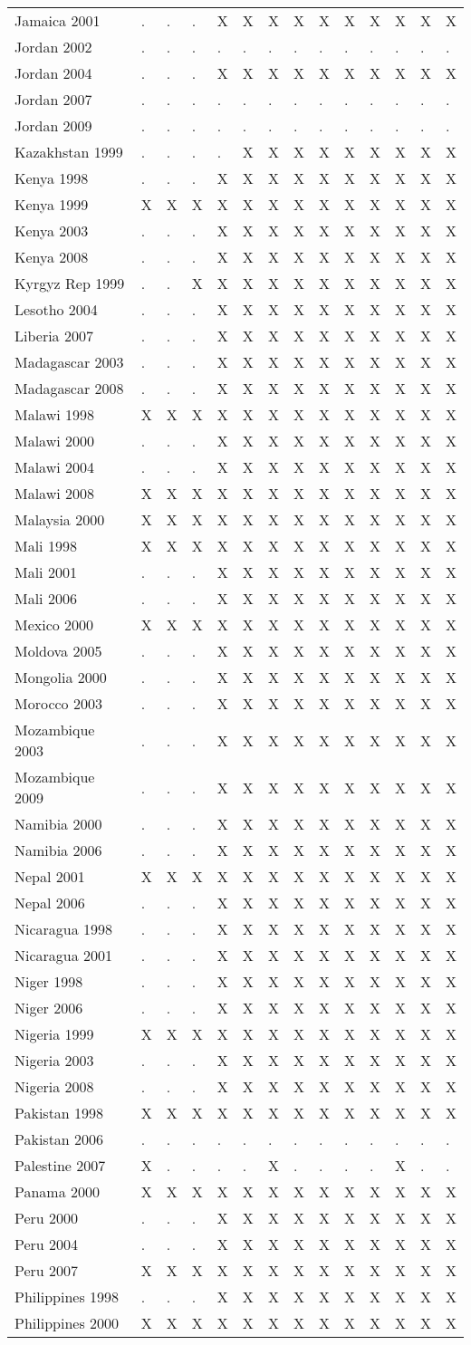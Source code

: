 \documentclass[a4paper]{article}
\begin{document}
\begin{longtable}{llllllllllllll}
Jamaica 2001&.&.&.&X&X&X&X&X&X&X&X&X&X\tabularnewline
Jordan 2002&.&.&.&.&.&.&.&.&.&.&.&.&.\tabularnewline
Jordan 2004&.&.&.&X&X&X&X&X&X&X&X&X&X\tabularnewline
Jordan 2007&.&.&.&.&.&.&.&.&.&.&.&.&.\tabularnewline
Jordan 2009&.&.&.&.&.&.&.&.&.&.&.&.&.\tabularnewline
Kazakhstan 1999&.&.&.&.&X&X&X&X&X&X&X&X&X\tabularnewline
Kenya 1998&.&.&.&X&X&X&X&X&X&X&X&X&X\tabularnewline
Kenya 1999&X&X&X&X&X&X&X&X&X&X&X&X&X\tabularnewline
Kenya 2003&.&.&.&X&X&X&X&X&X&X&X&X&X\tabularnewline
\newpage
Kenya 2008&.&.&.&X&X&X&X&X&X&X&X&X&X\tabularnewline
Kyrgyz Rep 1999&.&.&X&X&X&X&X&X&X&X&X&X&X\tabularnewline
Lesotho 2004&.&.&.&X&X&X&X&X&X&X&X&X&X\tabularnewline
Liberia 2007&.&.&.&X&X&X&X&X&X&X&X&X&X\tabularnewline
Madagascar 2003&.&.&.&X&X&X&X&X&X&X&X&X&X\tabularnewline
Madagascar 2008&.&.&.&X&X&X&X&X&X&X&X&X&X\tabularnewline
Malawi 1998&X&X&X&X&X&X&X&X&X&X&X&X&X\tabularnewline
Malawi 2000&.&.&.&X&X&X&X&X&X&X&X&X&X\tabularnewline
Malawi 2004&.&.&.&X&X&X&X&X&X&X&X&X&X\tabularnewline
Malawi 2008&X&X&X&X&X&X&X&X&X&X&X&X&X\tabularnewline
Malaysia 2000&X&X&X&X&X&X&X&X&X&X&X&X&X\tabularnewline
Mali 1998&X&X&X&X&X&X&X&X&X&X&X&X&X\tabularnewline
Mali 2001&.&.&.&X&X&X&X&X&X&X&X&X&X\tabularnewline
Mali 2006&.&.&.&X&X&X&X&X&X&X&X&X&X\tabularnewline
Mexico 2000&X&X&X&X&X&X&X&X&X&X&X&X&X\tabularnewline
Moldova 2005&.&.&.&X&X&X&X&X&X&X&X&X&X\tabularnewline
Mongolia 2000&.&.&.&X&X&X&X&X&X&X&X&X&X\tabularnewline
Morocco 2003&.&.&.&X&X&X&X&X&X&X&X&X&X\tabularnewline
Mozambique 2003&.&.&.&X&X&X&X&X&X&X&X&X&X\tabularnewline
Mozambique 2009&.&.&.&X&X&X&X&X&X&X&X&X&X\tabularnewline
Namibia 2000&.&.&.&X&X&X&X&X&X&X&X&X&X\tabularnewline
Namibia 2006&.&.&.&X&X&X&X&X&X&X&X&X&X\tabularnewline
Nepal 2001&X&X&X&X&X&X&X&X&X&X&X&X&X\tabularnewline
Nepal 2006&.&.&.&X&X&X&X&X&X&X&X&X&X\tabularnewline
Nicaragua 1998&.&.&.&X&X&X&X&X&X&X&X&X&X\tabularnewline
Nicaragua 2001&.&.&.&X&X&X&X&X&X&X&X&X&X\tabularnewline
Niger 1998&.&.&.&X&X&X&X&X&X&X&X&X&X\tabularnewline
Niger 2006&.&.&.&X&X&X&X&X&X&X&X&X&X\tabularnewline
Nigeria 1999&X&X&X&X&X&X&X&X&X&X&X&X&X\tabularnewline
Nigeria 2003&.&.&.&X&X&X&X&X&X&X&X&X&X\tabularnewline
Nigeria 2008&.&.&.&X&X&X&X&X&X&X&X&X&X\tabularnewline
Pakistan 1998&X&X&X&X&X&X&X&X&X&X&X&X&X\tabularnewline
Pakistan 2006&.&.&.&.&.&.&.&.&.&.&.&.&.\tabularnewline
Palestine 2007&X&.&.&.&.&X&.&.&.&.&X&.&.\tabularnewline
Panama 2000&X&X&X&X&X&X&X&X&X&X&X&X&X\tabularnewline
Peru 2000&.&.&.&X&X&X&X&X&X&X&X&X&X\tabularnewline
Peru 2004&.&.&.&X&X&X&X&X&X&X&X&X&X\tabularnewline
Peru 2007&X&X&X&X&X&X&X&X&X&X&X&X&X\tabularnewline
Philippines 1998&.&.&.&X&X&X&X&X&X&X&X&X&X\tabularnewline
Philippines 2000&X&X&X&X&X&X&X&X&X&X&X&X&X\tabularnewline

\end{longtable}
\end{document}
